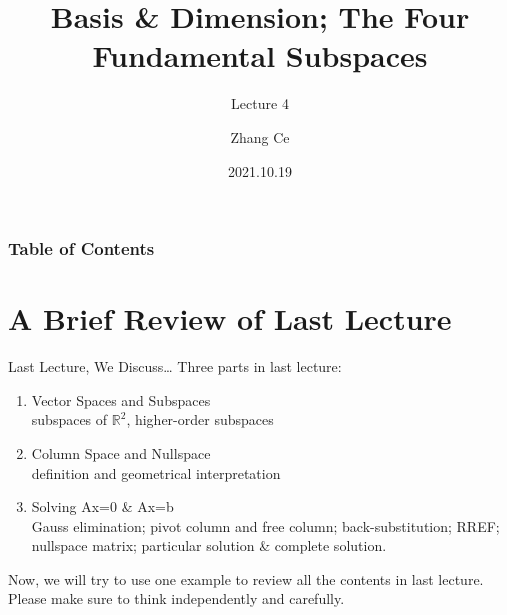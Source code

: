 \documentclass{beamer}
\title[Linear Algebra] %
{Basis \& Dimension; The Four Fundamental Subspaces}
\subtitle{Lecture 4}
\author[11910803@mail.sustech.edu.cn] %
{
    Zhang Ce
}
\institute[] %
{
    Department of Electrical and Electronic Engineering\\
    Southern University of Science and Technology
}
\date[2021.10.19] %
{2021.10.19}
\begin{document}
\frame{\titlepage}


\begin{frame}
\frametitle{Table of Contents}
\tableofcontents
\end{frame}
\section{A Brief Review of Last Lecture}
\begin{frame}{Last Lecture, We Discuss\dots}
Three parts in last lecture:
    \begin{enumerate}
        \item Vector Spaces and Subspaces\\
        subspaces of $\mathbb{R}^2$, higher-order subspaces
        \item Column Space and Nullspace\\
        definition and geometrical interpretation
        \item Solving Ax=0 \& Ax=b\\
        Gauss elimination; pivot column and free column; back-substitution; RREF; nullspace matrix; particular solution \& complete solution.
    \end{enumerate}

Now, we will try to use one example to review all the contents in last lecture. Please make sure to think independently and carefully.
\end{frame}
\end{document}
